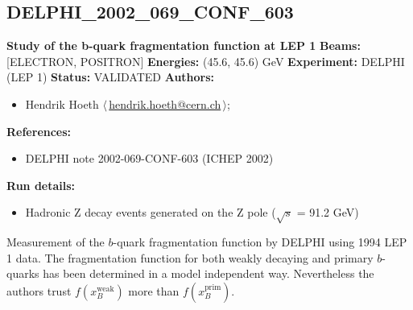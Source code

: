 \clearpage

\subsection{DELPHI\_2002\_069\_CONF\_603}
\textbf{Study of the b-quark fragmentation function at LEP 1}\newline
\textbf{Beams:} [ELECTRON, POSITRON] \newline
\textbf{Energies:} (45.6, 45.6) GeV \newline
\textbf{Experiment:} DELPHI (LEP 1) \newline
\textbf{Status:} VALIDATED\newline
\textbf{Authors:}
\begin{itemize}
  \item Hendrik Hoeth $\langle\,$\href{mailto:hendrik.hoeth@cern.ch}{hendrik.hoeth@cern.ch}$\,\rangle$;
\end{itemize}
\textbf{References:}
\begin{itemize}
  \item DELPHI note 2002-069-CONF-603 (ICHEP 2002)
\end{itemize}
\textbf{Run details:}
\begin{itemize}

  \item Hadronic Z decay events generated on the Z pole (\ensuremath{\sqrt{s}} = 91.2 GeV)\end{itemize}

\noindent Measurement of the $b$-quark fragmentation function by DELPHI using 1994 LEP 1 data. The fragmentation function for both weakly decaying and primary $b$-quarks has been determined in a model independent way. Nevertheless the authors trust $f(x_B^\text{weak})$ more than $f(x_B^\text{prim})$.

\clearpage


\clearpage

